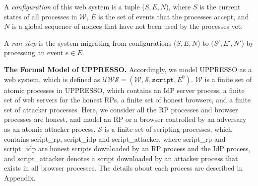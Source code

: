 \noindent A {\em configuration} of this web system is a tuple ($S, E, N$), where $S$ is the current states of all processes in $\mathcal{W}$, $E$ is the set of events that the processes accept, and $N$ is a global sequence of nonces that have not been used by the processes yet.

\noindent A {\em run step} is the system migrating from configurations ($S, E, N$) to ($S', E', N'$) by processing an event $e \in E$.

\noindent\textbf{The Formal Model of UPPRESSO.}
Accordingly, we model UPPRESSO as a web system, which is defined as $\mathcal{UWS} = (\mathcal{W}, \mathcal{S}, \mathtt{script}, E^0)$. $\mathcal{W}$ is a finite set of atomic processes in UPPRESSO, which contains an IdP server process, a finite set of web servers for the honest RPs, a finite set of honest browsers, and a finite set of attacker processes. Here, we consider all the RP processes and browser processes are honest, and model an RP or a browser controlled by an adversary as an atomic attacker process.
$\mathcal{S}$ is a finite set of scripting processes, which contains {\sf script\_rp}, {\sf script\_idp} and {\sf script\_attacker}, where {\sf script\_rp} and {\sf script\_idp} are honest scripts downloaded by an RP process and the IdP process, and {\sf script\_attacker} denotes a script downloaded by an attacker process that exists in all browser processes.
The details about each process are described in Appendix.
